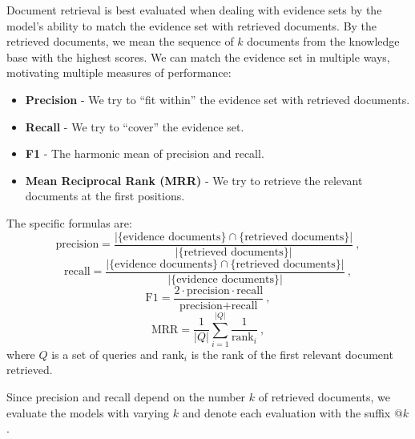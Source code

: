 Document retrieval is best evaluated when dealing with evidence sets by the model's ability to match the evidence set with retrieved documents.
By the retrieved documents, we mean the sequence of $k$ documents from the knowledge base with the highest scores.
We can match the evidence set in multiple ways, motivating multiple measures of performance:
\begin{itemize}
    \item \textbf{Precision} - We try to ``fit within'' the evidence set with retrieved documents.
    \item \textbf{Recall} - We try to ``cover'' the evidence set.
    \item \textbf{F1} - The harmonic mean of precision and recall. 
    \item \textbf{Mean Reciprocal Rank (MRR)} \citep{mrr} - We try to retrieve the relevant documents at the first positions. 
\end{itemize}
The specific formulas are: 
\begin{equation}
    \text{precision} = \frac{|\{\text{evidence documents}\}\cap\{\text{retrieved documents}\}|}{|\{\text{retrieved documents}\}|}\ ,
\end{equation}
\begin{equation}
    \text{recall} = \frac{|\{\text{evidence documents}\}\cap\{\text{retrieved documents}\}|}{|\{\text{evidence documents}\}|}\ ,
\end{equation}
\begin{equation}
    \text{F1} = 
    \frac{2\cdot\text{precision}\cdot\text{recall}}{\text{precision}+\text{recall}}\ ,
\end{equation}
\begin{equation}
    \text{MRR} = \frac{1}{|Q|}\sum_{i=1}^{|Q|}{\frac{1}{\text{rank}_i}}\ ,
\end{equation}
where $Q$ is a set of queries and $\text{rank}_i$ is the rank of the first relevant document retrieved.

Since precision and recall depend on the number $k$ of retrieved documents, we evaluate the models with varying $k$ and denote each evaluation with the suffix $\text{@}k$.